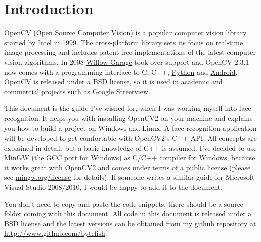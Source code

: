 \section{Introduction}

\href{http://opencv.willowgarage.com}{OpenCV (Open Source Computer Vision)} is a popular computer vision library started by \href{http://www.intel.com}{Intel} in 1999. The cross-platform library sets its focus on real-time image processing and includes patent-free implementations of the latest computer vision algorithms. In 2008 \href{http://www.willowgarage.com}{Willow Garage} took over support and OpenCV 2.3.1 now comes with a programming interface to C, C++, \href{http://www.python.org}{Python} and \href{http://www.android.com}{Android}. OpenCV is released under a BSD license, so it is used in academic and commercial projects such as \href{http://www.google.com/streetview}{Google Streetview}.

This document is the guide I've wished for, when I was working myself into face recognition. It helps you with installing OpenCV2 on your machine and explains you how to build a project on Windows and Linux. A face recognition application will be developed to get comfortable with OpenCV2's C++ API. All concepts are explained in detail, but a basic knowledge of C++ is assumed. I've decided to use \href{http://www.mingw.org}{MinGW} (the GCC port for Windows) as C/C++ compiler for Windows, because it works great with OpenCV2 and comes under terms of a public license (please see \href{http://www.mingw.org/license}{mingw.org/license} for details). If someone writes a similar guide for Microsoft Visual Studio 2008/2010, I would be happy to add it to the document.

You don't need to copy and paste the code snippets, there should be a source folder coming with this document. All code in this document is released under a BSD license and the latest versions can be obtained from my github repository at \url{http://www.github.com/bytefish}.
